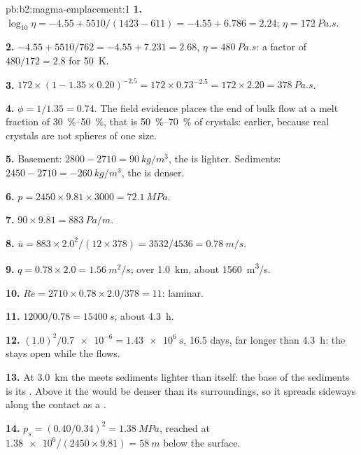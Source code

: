 \begin{solution}{pb:b2:magma-emplacement:1}
\textbf{1.} $\log_{10}\eta = -4.55 + 5510/(1423 - 611) = -4.55 + 6.786 = 2.24$;
$\eta = \qty{172}{Pa.s}$.

\textbf{2.} $-4.55 + 5510/762 = -4.55 + 7.231 = 2.68$, $\eta = \qty{480}{Pa.s}$: a
factor of $480/172 = 2.8$ for \qty{50}{K}.

\textbf{3.} $172\times(1 - 1.35\times0.20)^{-2.5} = 172\times0.73^{-2.5} = 172\times2.20 =
\qty{378}{Pa.s}$.

\textbf{4.} $\phi = 1/1.35 = 0.74$. The field evidence places the end of bulk flow
at a melt fraction of \qtyrange{30}{50}{\percent}, that is
\qtyrange{50}{70}{\percent} of crystals: earlier, because real crystals are not
spheres of one size.

\textbf{5.} Basement: $2800 - 2710 = \qty{90}{kg/m^3}$, the  is lighter.
Sediments: $2450 - 2710 = \qty{-260}{kg/m^3}$, the  is denser.

\textbf{6.} $p = 2450\times9.81\times3000 = \qty{72.1}{MPa}$.

\textbf{7.} $90\times9.81 = \qty{883}{Pa/m}$.

\textbf{8.} $\bar u = 883\times2.0^2/(12\times378) = 3532/4536 = \qty{0.78}{m/s}$.

\textbf{9.} $q = 0.78\times2.0 = \qty{1.56}{m^2/s}$; over \qty{1.0}{km}, about
\qty{1560}{m^3/s}.

\textbf{10.} $Re = 2710\times0.78\times2.0/378 = 11$: laminar.

\textbf{11.} $12000/0.78 = \qty{15400}{s}$, about \qty{4.3}{h}.

\textbf{12.} $(1.0)^2/\num{0.7e-6} = \qty{1.43e6}{s}$, 16.5 days, far longer than
\qty{4.3}{h}: the  stays open while the  flows.

\textbf{13.} At \qty{3.0}{km} the  meets sediments lighter than itself: the
base of the sediments is its . Above it the  would
be denser than its surroundings, so it spreads sideways along the contact as a
.

\textbf{14.} $p_s = (0.40/0.34)^2 = \qty{1.38}{MPa}$, reached at
$\num{1.38e6}/(2450\times9.81) = \qty{58}{m}$ below the surface.


\end{solution}

